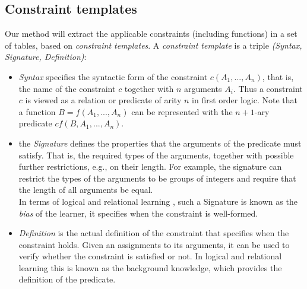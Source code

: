 \documentclass{sig-alternate-05-2015}
\newcommand{\format}[1]{\textit{#1}\xspace}
\newcommand{\template}{\format{constraint template}}
\newcommand{\CName}{Syntax\xspace}
\newcommand{\CSignature}{Signature\xspace}
\newcommand{\CFunction}{Definition\xspace}
\begin{document}
\subsection{Constraint templates}
Our method will extract the applicable constraints (including functions) in a set of tables, based on \textit{constraint templates}.
%
A \template is a triple \textit{(\CName, \CSignature, \CFunction)}:
\begin{itemize}
\item
\textit{\CName}  specifies the syntactic form of the constraint $c(A_1, ...,A_n)$, that is, the name of the constraint $c$ together
with $n$ arguments $A_i$. Thus a constraint $c$ is viewed as a relation or predicate of arity $n$ in first order logic. Note that a function $B=f(A_1,...,A_n)$ can be represented with the $n+1$-ary predicate $cf(B,A_1,...,A_n)$.

\item the \textit{\CSignature} defines the properties that the arguments of the predicate must satisfy. That is, the required types of the arguments, together
with possible further restrictions, e.g., on their length. For example, the signature can restrict the types of the arguments to be groups of integers and require that the length of all arguments be equal. \\
In terms of logical and relational learning \cite{bookLuc}, such a \CSignature is known as the {\em bias} of the learner, it specifies when the constraint is well-formed.

\item \textit{\CFunction} is the actual definition of the constraint that specifies when the constraint holds. Given an assignments to its arguments, it can be used to verify whether the constraint is satisfied or not. %
In logical and relational learning this is known as the background knowledge, which provides the definition of the predicate.
\end{itemize}
\end{document}
